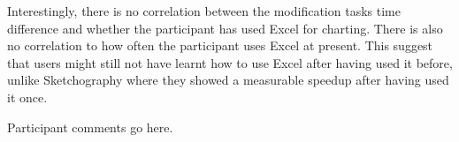 Interestingly, there is no correlation between the modification tasks time difference and whether the participant has used Excel for charting. There is also no correlation to how often the participant uses Excel at present. This suggest that users might still not have learnt how to use Excel after having used it before, unlike Sketchography where they showed a measurable speedup after having used it once.

Participant comments go here.

